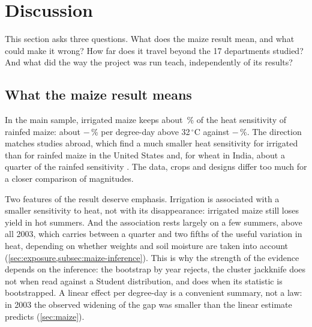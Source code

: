 \section{Discussion}
\label{sec:discussion}

This section asks three questions. What does the maize result mean, and what could make it wrong? How far does it travel beyond the 17 departments studied? And what did the way the project was run teach, independently of its results?

\subsection{What the maize result means}

In the main sample, irrigated maize keeps about \IrrShareOfRainfedSens\,\% of the heat sensitivity of rainfed maize: about $-$\QoneIrrigatedPct\,\% per degree-day above 32\,$^{\circ}$C against $-$\QoneRainfedPct\,\%. The direction matches studies abroad, which find a much smaller heat sensitivity for irrigated than for rainfed maize in the United States \parencite{schauberger2017} and, for wheat in India, about a quarter of the rainfed sensitivity \parencite{zaveri2019}. The data, crops and designs differ too much for a closer comparison of magnitudes.

Two features of the result deserve emphasis. Irrigation is associated with a smaller sensitivity to heat, not with its disappearance: irrigated maize still loses yield in hot summers. And the association rests largely on a few summers, above all 2003, which carries between a quarter and two fifths of the useful variation in heat, depending on whether weights and soil moisture are taken into account (\cref{sec:exposure,subsec:maize-inference}). This is why the strength of the evidence depends on the inference: the bootstrap by year rejects, the cluster jackknife does not when read against a Student distribution, and does when its statistic is bootstrapped. A linear effect per degree-day is a convenient summary, not a law: in 2003 the observed widening of the gap was smaller than the linear estimate predicts (\cref{sec:maize}).

